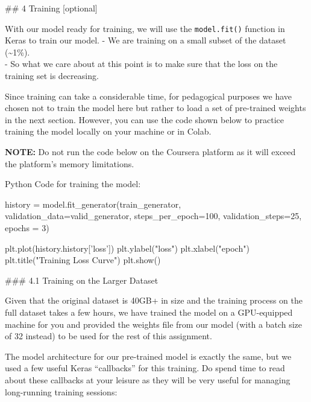 \documentclass[11pt]{article}
\newenvironment{Shaded}{}{}
\newcommand{\DecValTok}[1]{\textcolor[rgb]{0.25,0.63,0.44}{{#1}}}
\newcommand{\StringTok}[1]{\textcolor[rgb]{0.25,0.44,0.63}{{#1}}}
\newcommand{\NormalTok}[1]{{#1}}
\newcommand{\OperatorTok}[1]{\textcolor[rgb]{0.40,0.40,0.40}{{#1}}}
\begin{document}
     \#\# 4 Training {[}optional{]}

With our model ready for training, we will use the \texttt{model.fit()}
function in Keras to train our model. - We are training on a small
subset of the dataset (\textasciitilde{}1\%).\\
- So what we care about at this point is to make sure that the loss on
the training set is decreasing.

Since training can take a considerable time, for pedagogical purposes we
have chosen not to train the model here but rather to load a set of
pre-trained weights in the next section. However, you can use the code
shown below to practice training the model locally on your machine or in
Colab.

\textbf{NOTE:} Do not run the code below on the Coursera platform as it
will exceed the platform's memory limitations.

Python Code for training the model:

\begin{Shaded}
\begin{Highlighting}[]
\NormalTok{history }\OperatorTok{=}\NormalTok{ model.fit_generator(train_generator, }
\NormalTok{                              validation_data}\OperatorTok{=}\NormalTok{valid_generator,}
\NormalTok{                              steps_per_epoch}\OperatorTok{=}\DecValTok{100}\NormalTok{, }
\NormalTok{                              validation_steps}\OperatorTok{=}\DecValTok{25}\NormalTok{, }
\NormalTok{                              epochs }\OperatorTok{=} \DecValTok{3}\NormalTok{)}

\NormalTok{plt.plot(history.history[}\StringTok{'loss'}\NormalTok{])}
\NormalTok{plt.ylabel(}\StringTok{"loss"}\NormalTok{)}
\NormalTok{plt.xlabel(}\StringTok{"epoch"}\NormalTok{)}
\NormalTok{plt.title(}\StringTok{"Training Loss Curve"}\NormalTok{)}
\NormalTok{plt.show()}
\end{Highlighting}
\end{Shaded}

     \#\#\# 4.1 Training on the Larger Dataset

Given that the original dataset is 40GB+ in size and the training
process on the full dataset takes a few hours, we have trained the model
on a GPU-equipped machine for you and provided the weights file from our
model (with a batch size of 32 instead) to be used for the rest of this
assignment.

The model architecture for our pre-trained model is exactly the same,
but we used a few useful Keras ``callbacks'' for this training. Do spend
time to read about these callbacks at your leisure as they will be very
useful for managing long-running training sessions:
\end{document}
